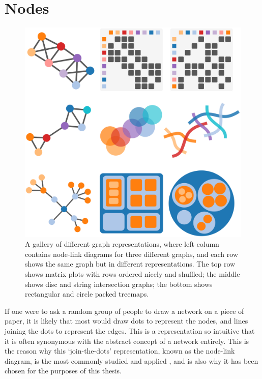 \chapter{Nodes}
\begin{figure}
  \centering
  \includegraphics[width=\textwidth]{stress/representations.pdf}
  \caption[A gallery of graph representations]{A gallery of different graph representations, where left column contains node-link diagrams for three different graphs, and each row shows the same graph but in different representations. The top row shows matrix plots with rows ordered nicely and shuffled; the middle shows disc and string intersection graphs; the bottom shows rectangular and circle packed treemaps.
  }
  \label{fig:graph_representations}
\end{figure}

If one were to ask a random group of people to draw a network on a piece of paper, it is likely that most would draw dots to represent the nodes, and lines joining the dots to represent the edges. This is a representation so intuitive that it is often synonymous with the abstract concept of a network entirely.
This is the reason why this `join-the-dots' representation, known as the node-link diagram, is the most commonly studied and applied \cite{Ghoniem2004}, and is also why it has been chosen for the purposes of this thesis.

